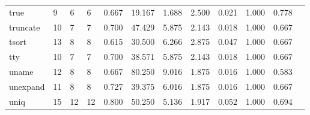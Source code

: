 \begin{longtable}{lp{1.00cm}p{1.00cm}p{1.00cm}p{1.00cm}p{1.00cm}p{1.00cm}p{1.00cm}p{1.00cm}p{1.00cm}p{1.00cm}p{1.00cm}}
true      &                            9 &                  6 &                                 6 &                                      0.667 &                                 19.167 &                                        1.688 &                             2.500 &                                   0.021 &                        1.000 &                                        0.778 \\
truncate  &                           10 &                  7 &                                 7 &                                      0.700 &                                 47.429 &                                        5.875 &                             2.143 &                                   0.018 &                        1.000 &                                        0.667 \\
tsort     &                           13 &                  8 &                                 8 &                                      0.615 &                                 30.500 &                                        6.266 &                             2.875 &                                   0.047 &                        1.000 &                                        0.667 \\
tty       &                           10 &                  7 &                                 7 &                                      0.700 &                                 38.571 &                                        5.875 &                             2.143 &                                   0.018 &                        1.000 &                                        0.667 \\
uname     &                           12 &                  8 &                                 8 &                                      0.667 &                                 80.250 &                                        9.016 &                             1.875 &                                   0.016 &                        1.000 &                                        0.583 \\
unexpand  &                           11 &                  8 &                                 8 &                                      0.727 &                                 39.375 &                                        6.016 &                             1.875 &                                   0.016 &                        1.000 &                                        0.667 \\
uniq      &                           15 &                 12 &                                12 &                                      0.800 &                                 50.250 &                                        5.136 &                             1.917 &                                   0.052 &                        1.000 &                                        0.694 \\

\end{longtable}

